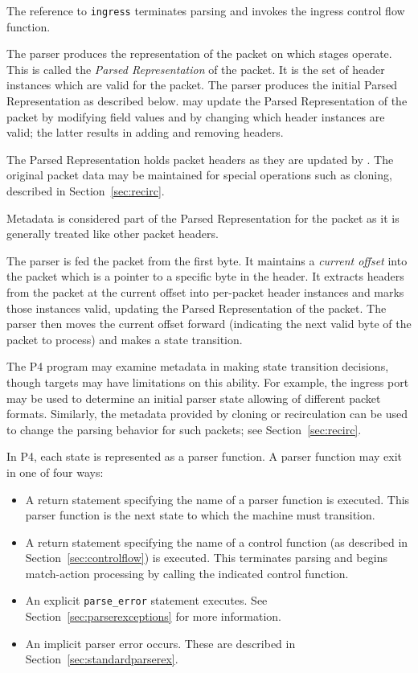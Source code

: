 \documentclass[12pt]{article}
\begin{document}
The reference to \texttt{ingress} terminates parsing and invokes the ingress control
flow function.


The parser produces the representation of the packet on which \matchaction
stages operate. This is called the \textit{Parsed Representation} of the packet.
It is the set of header instances which are valid for the packet. The parser
produces the initial Parsed Representation as described below. \Matchaction
may update the Parsed Representation of the packet by modifying field values
and by changing which header instances are valid; the latter results in adding
and removing headers.

The Parsed Representation holds packet headers as they are updated by \matchaction.
The original packet data may be maintained for special operations such as
cloning, described in Section~\ref{sec:recirc}.

Metadata is considered part of the Parsed Representation for the packet as
it is generally treated like other packet headers.


The parser is fed the packet from the first byte. It maintains a \textit{current
offset} into the packet which is a pointer to a specific byte in the header. It
extracts headers from the packet at the current offset into per-packet header
instances and marks those instances valid, updating the Parsed Representation
of the packet. The parser then moves the current offset forward (indicating
the next valid byte of the packet to process) and makes a state transition.

The P4 program may examine metadata in making state transition decisions,
though targets may have limitations on this ability.  For example, the ingress
port may be used to determine an initial parser state allowing of different
packet formats. Similarly, the metadata provided by cloning or recirculation
can be used to change the parsing behavior for such packets; see
Section~\ref{sec:recirc}.

In P4, each state is represented as a parser function. A parser function may
exit in one of four ways:

\begin{itemize}
\item
A return statement specifying the name of a parser function is executed.  This
parser function is the next state to which the machine must transition.
\item
A return statement specifying the name of a control function (as described
in Section~\ref{sec:controlflow}) is executed. This terminates
parsing and begins match-action processing by calling the indicated control
function.
\item
An explicit \texttt{parse_error} statement executes.
See Section~\ref{sec:parserexceptions} for more information.
\item
An implicit parser error occurs. These are described in
Section~\ref{sec:standardparserex}.
\end{itemize}
\end{document}
